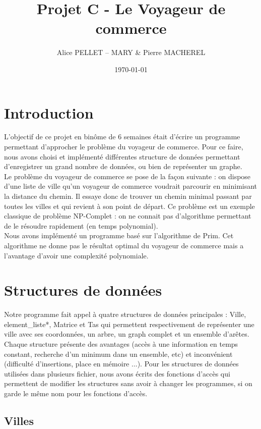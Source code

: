 \documentclass[a4paper,11pt]{article}
\date{\today}
\title{Projet C - Le Voyageur de commerce}
\author{Alice PELLET -- MARY \& Pierre MACHEREL}
\begin{document}
\maketitle
\tableofcontents

\section*{Introduction} %

L'objectif de ce projet en binôme de 6 semaines était d'écrire un programme permettant d'approcher le problème du voyageur de commerce. Pour ce faire, nous avons choisi et implémenté différentes structure de données permettant d'enregistrer un grand nombre de données, ou bien de représenter un graphe.\\
Le problème du voyageur de commerce se pose de la façon suivante : on dispose d'une liste de ville qu'un voyageur de commerce voudrait parcourir en minimisant la distance du chemin. Il essaye donc de trouver un chemin minimal passant par toutes les villes et qui revient à son point de départ. Ce problème est un exemple classique de problème NP-Complet : on ne connait pas d'algorithme permettant de le résoudre rapidement (en temps polynomial).\\
Nous avons implémenté un programme basé sur l'algorithme de Prim. Cet algorithme ne donne pas le résultat optimal du voyageur de commerce mais a l'avantage d'avoir une complexité polynomiale.\\

\section{Structures de données}
Notre programme fait appel à quatre structures de données principales : \textsf{Ville}, \textsf{element\_liste*}, \textsf{Matrice} et \textsf{Tas} qui permettent respectivement de représenter une ville avec ses coordonnées, un arbre, un graph complet et un ensemble d'arêtes.
Chaque structure présente des avantages (accès à une information en temps constant, recherche d'un minimum dans un ensemble, etc) et inconvénient (difficulté d'insertions, place en mémoire ...).
Pour les structures de données utilisées dans plusieurs fichier, nous avons écrits des fonctions d'accès qui permettent de modifier les structures sans avoir à changer les programmes, si on garde le même nom pour les fonctions d'accès.

\subsection{Villes}
\end{document}
